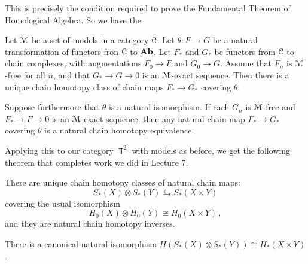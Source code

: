 This is precisely the condition required to prove the Fundamental Theorem
of Homological Algebra. So we have the 
\begin{theorem}
Let $\mathcal M$ be a set of models in a category $\mathcal C$. Let $\theta:F\to G$ be 
a natural transformation of functors fron $\mathcal C$ to $\mathbf{Ab}$. Let 
$F_*$ and $G_*$ be functors from $\mathcal C$ to chain complexes, with augmentations
$F_0\to F$ and $G_0\to G$. Assume that $F_n$ is $\mathcal M$-free for all $n$, and
that $G_*\to G\to0$ is an $\mathcal M$-exact sequence. Then there is a unique
chain homotopy class of chain maps $F_*\to G_*$ covering $\theta$. 
\end{theorem}
\begin{corollary}
Suppose furthermore that $\theta$ is a natural isomorphism. If
each $G_n$ is $\mathcal M$-free and $F_*\to F\to0$ is an $\mathcal M$-exact
sequence, then any natural chain map $F_*\to G_*$ covering $\theta$ is  
a natural chain homotopy equivalence. 
\end{corollary}

Applying this to our category $\Top^2$ with models as before, we get 
the following theorem that completes work we did in Lecture 7.
\begin{theorem}
There are unique chain homotopy classes of natural chain maps:
\begin{equation*}
S_\ast(X)\otimes S_\ast(Y)\leftrightarrows S_\ast(X\times Y)
\end{equation*}
covering the usual isomorphism
\[
H_0(X)\otimes H_0(Y)\cong H_0(X\times Y)\,,
\]
and they are natural chain homotopy inverses. 
\end{theorem}
\begin{corollary}
There is a canonical natural 
isomorphism $H(S_\ast(X)\otimes S_\ast(Y))\cong H_\ast(X\times Y)$.
\end{corollary}

